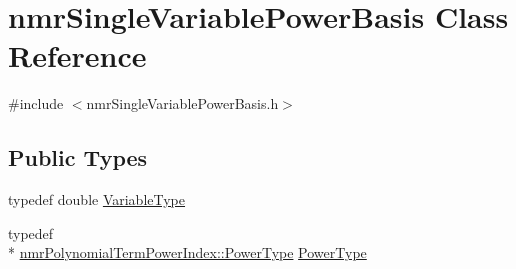 \hypertarget{classnmr_single_variable_power_basis}{\section{nmr\-Single\-Variable\-Power\-Basis Class Reference}
\label{classnmr_single_variable_power_basis}
}


{\ttfamily \#include $<$nmr\-Single\-Variable\-Power\-Basis.\-h$>$}

\subsection*{Public Types}
\begin{DoxyCompactItemize}
\item 
typedef double \hyperlink{classnmr_single_variable_power_basis_a4500df2ac423b7a55c32183275b2d7a2}{Variable\-Type}
\item 
typedef \\*
\hyperlink{classnmr_polynomial_term_power_index_a2eec01c3a2c3f56f47982ceffd8e36ed}{nmr\-Polynomial\-Term\-Power\-Index\-::\-Power\-Type} \hyperlink{classnmr_single_variable_power_basis_ae580b034e01160a9fc39455a9356730f}{Power\-Type}
\end{DoxyCompactItemize}
